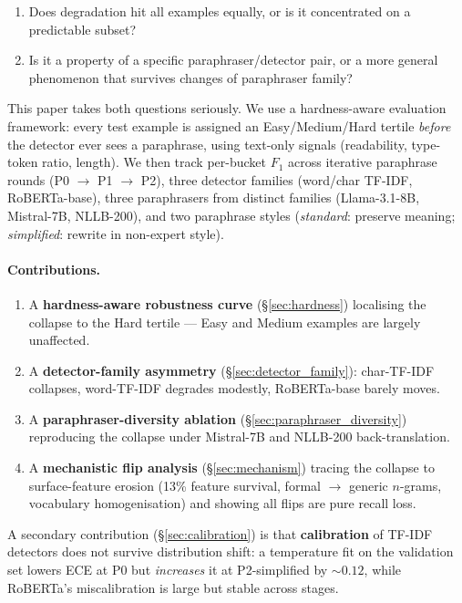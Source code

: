 \documentclass[11pt,a4paper]{article}
\begin{document}
\begin{enumerate}
\item Does degradation hit all examples equally, or is it concentrated on a
predictable subset?
\item Is it a property of a specific paraphraser/detector pair, or a more
general phenomenon that survives changes of paraphraser family?
\end{enumerate}

This paper takes both questions seriously. We use a hardness-aware evaluation
framework: every test example is assigned an Easy/Medium/Hard tertile
\emph{before} the detector ever sees a paraphrase, using
text-only signals (readability, type-token ratio, length).
We then track per-bucket $F_1$ across iterative paraphrase rounds
(P0 $\to$ P1 $\to$ P2), three detector families
(word/char TF-IDF, RoBERTa-base), three paraphrasers from
distinct families (Llama-3.1-8B, Mistral-7B, NLLB-200), and two paraphrase
styles (\emph{standard}: preserve meaning; \emph{simplified}: rewrite in
non-expert style).

\paragraph{Contributions.}
\begin{enumerate}
\item A \textbf{hardness-aware robustness curve}
(\S\ref{sec:hardness}) localising the collapse to the Hard tertile —
Easy and Medium examples are largely unaffected.
\item A \textbf{detector-family asymmetry}
(\S\ref{sec:detector_family}): char-TF-IDF collapses, word-TF-IDF degrades
modestly, RoBERTa-base barely moves.
\item A \textbf{paraphraser-diversity ablation}
(\S\ref{sec:paraphraser_diversity}) reproducing the collapse under Mistral-7B
and NLLB-200 back-translation.
\item A \textbf{mechanistic flip analysis} (\S\ref{sec:mechanism}) tracing
the collapse to surface-feature erosion (13\% feature survival,
formal $\to$ generic $n$-grams, vocabulary homogenisation) and showing all
flips are pure recall loss.
\end{enumerate}

A secondary contribution (\S\ref{sec:calibration}) is that
\textbf{calibration} of TF-IDF detectors does not survive distribution
shift: a temperature fit on the validation set lowers ECE at P0 but
\emph{increases} it at P2-simplified by ${\sim}0.12$, while RoBERTa's
miscalibration is large but stable across stages.
\end{document}
